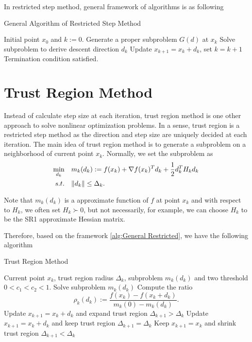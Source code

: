 \documentclass[11pt]{report}
\begin{document}
In restricted step method, general framework of algorithms is as following
\begin{algorithm}[H]
\caption{General Algorithm of Restricted Step Method}
\label{alg:General Restricted}
\begin{algorithmic}[1]
\REQUIRE Initial point $x_0$ and $k:=0$.
\REPEAT 
    \STATE Generate a proper subproblem $G(d)$ at $x_k$
    \STATE Solve subproblem to derive descent direction $d_k$
    \STATE Update $x_{k+1} = x_k + d_k$, set $k = k + 1$
\UNTIL Termination condition satisfied.
\end{algorithmic}
\end{algorithm}

\section{Trust Region Method}
Instead of calculate step size at each iteration, trust region method is one other approach to solve nonlinear optimization problems. In a sense, trust region is a restricted step method as the direction and step size are uniquely decided at each iteration. The main idea of trust region method is to generate a subproblem on a neighborhood of current point $x_k$. Normally, we set the subproblem as
\begin{align}\label{eq: trust region subproblem}
\min_{d_k}\quad & m_k(d_k) := f(x_k) + \nabla f(x_k)^Td_k + \frac{1}{2}d_k^TH_kd_k\\
s.t. \quad & \|d_k\| \leq \Delta_k.
\end{align}

Note that $m_k(d_k)$ is a approximate function of $f$ at point $x_k$ and with respect to $H_k$, we often set $H_k\succ 0$, but not necessarily, for example, we can choose $H_k$ to be the SR1 approximate Hessian matrix. 

Therefore, based on the framework \ref{alg:General Restricted}, we have the following algorithm
\begin{algorithm}[H]
\caption{Trust Region Method}
\label{alg:Trust Region Method}
\begin{algorithmic}[1]
\REQUIRE Current point $x_k$, trust region radius $\Delta_k$, subproblem $m_k(d_k)$ and two threshold $0<c_1 <c_2 <1$.
\REPEAT
\STATE Solve subproblem $m_k(d_k)$
\STATE Compute the ratio
\begin{equation}
    \rho_k(d_k) := \frac{f(x_k)-f(x_k+d_k)}{m_k(0)-m_k(d_k)}.
\end{equation}
\STATE Update $x_{k+1} = x_k + d_k$ and expand trust region $\Delta_{k+1} > \Delta_k$
\ELSE
{}
\STATE Update $x_{k+1} = x_k + d_k$ and keep trust region $\Delta_{k+1} = \Delta_k$
\ENDIF
\ELSE
{}
\STATE Keep $x_{k+1} = x_k$ and shrink trust region $\Delta_{k+1} < \Delta_k$
\ENDIF
\ENDIF
{}
\end{algorithmic}
\end{algorithm}
\end{document}
